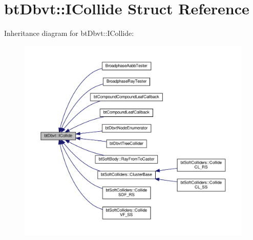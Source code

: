 \hypertarget{structbtDbvt_1_1ICollide}{}\section{bt\+Dbvt\+:\+:I\+Collide Struct Reference}
\label{structbtDbvt_1_1ICollide}


Inheritance diagram for bt\+Dbvt\+:\+:I\+Collide\+:
\nopagebreak
\begin{figure}[H]
\begin{center}
\leavevmode
\includegraphics[width=350pt]{structbtDbvt_1_1ICollide__inherit__graph}
\end{center}
\end{figure}
